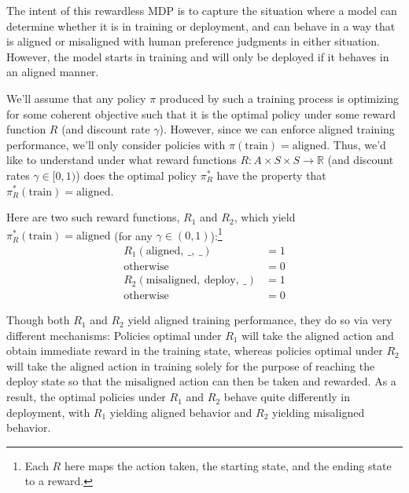 \documentclass[11pt]{article}
\newcommand\todo[1]{\textcolor{badred}{#1}}
\begin{document}
The intent of this rewardless MDP is to capture the situation where a model can determine whether it is in training or deployment, and can behave in a way that is aligned or misaligned with human preference judgments in either situation. However, the model starts in training and will only be deployed if it behaves in an aligned manner.

We'll assume that any policy $\pi$ produced by such a training process is optimizing for some coherent objective such that it is the optimal policy under some reward function $R$ (and discount rate $\gamma$). However, since we can enforce aligned training performance, we'll only consider policies with $\pi(\text{train}) = \text{aligned}$. Thus, we'd like to understand under what reward functions $R: A \times S \times S \to \mathbb R$ (and discount rates $\gamma \in [0, 1)$) does the optimal policy $\pi^*_R$ have the property that $\pi^*_R(\text{train}) = \text{aligned}$.


Here are two such reward functions, $R_1$ and $R_2$, which yield $\pi^*_R(\text{train}) = \text{aligned}$ (for any $\gamma \in (0, 1)$):\footnote{Each $R$ here maps the action taken, the starting state, and the ending state to a reward.}
\begin{align*}
    R_1(\text{aligned},~ \_,~ \_) &= 1 \\
    \text{otherwise} &= 0 \\
    R_2(\text{misaligned},~ \text{deploy},~ \_) &= 1 \\
    \text{otherwise} &= 0
\end{align*}


Though both $R_1$ and $R_2$ yield aligned training performance, they do so via very different mechanisms: Policies optimal under $R_1$ will take the $\text{aligned}$ action and obtain immediate reward in the training state, whereas policies optimal under $R_2$ will take the $\text{aligned}$ action in training solely for the purpose of reaching the $\text{deploy}$ state so that the $\text{misaligned}$ action can then be taken and rewarded. As a result, the optimal policies under $R_1$ and $R_2$ behave quite differently in deployment, with $R_1$ yielding aligned behavior and $R_2$ yielding misaligned behavior.
\end{document}
